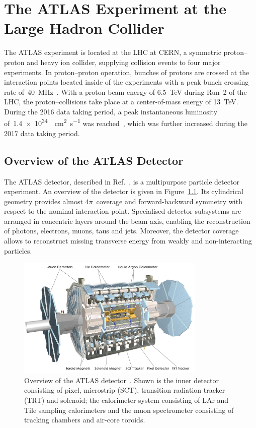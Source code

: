 \chapter{The ATLAS Experiment at the Large Hadron Collider}
\label{chap:atlas}

The ATLAS experiment is located at the LHC at CERN, a symmetric proton--proton
and heavy ion collider, supplying collision events to four major experiments. In
proton--proton operation, bunches of protons are crossed at the interaction
points located inside of the experiments with a peak bunch crossing rate
of~\SI{40}{\mega\hertz}~\cite{lhc}. With a proton beam energy of \SI{6.5}{\TeV}
during Run~2 of the LHC, the proton--collisions take place at a center-of-mass
energy of \SI{13}{\TeV}. During the 2016 data taking period, a peak
instantaneous luminosity of~\SI{1.4e34}{\per\square\centi\metre\per\second} was
reached~\cite{lhc_2016_report}, which was further increased during the 2017 data
taking period.

\section{Overview of the ATLAS Detector}
\label{sec:atlas}

The ATLAS detector, described in Ref.\ \cite{atlas_detector}, is a multipurpose
particle detector experiment. An overview of the detector is given in
Figure~\ref{fig:atlas_detector}. Its cylindrical geometry provides almost
$4\pi$~coverage and forward-backward symmetry with respect to the nominal
interaction point. Specialised detector subsystems are arranged in concentric
layers around the beam axis, enabling the reconstruction of photons, electrons,
muons, taus and jets. Moreover, the detector coverage allows to reconstruct
missing transverse energy from weakly and non-interacting particles.

\begin{figure}[htb]
  \centering
  \includegraphics[width=0.8\textwidth]{./figures/atlas/overview.jpg}
  \caption[Overview of the ATLAS detector]{Overview of the ATLAS
    detector~\cite{atlas_detector}. Shown is the inner detector consisting of
    pixel, microstrip (SCT), transition radiation tracker (TRT) and solenoid;
    the calorimeter system consisting of LAr and Tile sampling calorimeters and
    the muon spectrometer consisting of tracking chambers and air-core toroids.}
  \label{fig:atlas_detector}
\end{figure}

